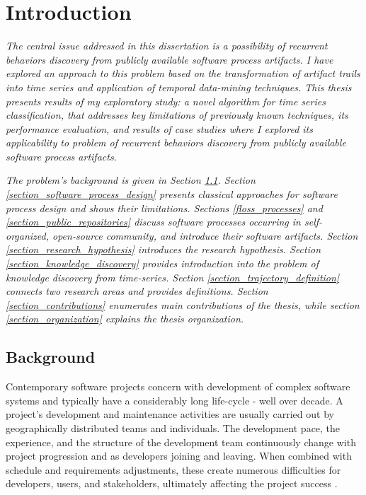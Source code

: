 \chapter{Introduction}\label{chapter_introduction}
\textit{The central issue addressed in this dissertation is a possibility of recurrent behaviors discovery from 
publicly available software process artifacts. I have explored an approach to this problem based on the 
transformation of artifact trails into time series and application of temporal data-mining techniques. 
This thesis presents results of my exploratory study: a novel algorithm for time series classification, 
that addresses key limitations of previously known techniques, its performance evaluation, and results
of case studies where I explored its applicability to problem of recurrent behaviors discovery from 
publicly available software process artifacts.}

\textit{The problem's background is given in Section \ref{section_background}. 
Section \ref{section_software_process_design} presents classical approaches for software process design and 
shows their limitations. 
Sections \ref{floss_processes} and \ref{section_public_repositories} discuss software processes occurring in 
self-organized, open-source community, and introduce their software artifacts.
Section \ref{section_research_hypothesis} introduces the research hypothesis.
Section \ref{section_knowledge_discovery} provides introduction into the problem of knowledge discovery from time-series.
Section \ref{section_trajectory_definition} connects two research areas and provides definitions.
Section \ref{section_contributions} enumerates main contributions of the thesis, 
while section \ref{section_organization} explains the thesis organization.}

%
%
\section{Background}\label{section_background}
Contemporary software projects concern with development of complex software systems and typically have 
a considerably long life-cycle - well over decade.
A project's development and maintenance activities are usually carried out by geographically 
distributed teams and individuals. The development pace, the experience, and the structure of the 
development team continuously change with project progression and as developers joining and leaving. 
When combined with schedule and requirements adjustments, these create numerous difficulties 
for developers, users, and stakeholders, ultimately affecting the project success \cite{citeulike:2207657}. 

